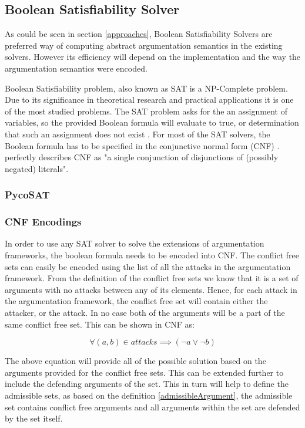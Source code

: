 \subsection{Boolean Satisfiability Solver}
As could be seen in section \ref{approaches}, Boolean Satisfiability Solvers are preferred way of computing abstract argumentation semantics in the existing solvers. However its efficiency will depend on the implementation and the way the argumentation semantics were encoded. 

Boolean Satisfiability problem, also known as SAT is a NP-Complete problem. Due to its significance in theoretical research and practical applications it is one of the most studied problems. The SAT problem asks for the an assignment of variables, so the provided Boolean formula will evaluate to true, or determination that such an assignment does not exist \citep{satSolver1}. For most of the SAT solvers, the Boolean formula has to be specified in the conjunctive normal form (CNF) \citep{SatSolver2}. \citet{cnfDefinition} perfectly describes CNF as "a single conjunction of disjunctions of (possibly negated) literals". 


\subsubsection{PycoSAT}


\subsubsection{CNF Encodings}
In order to use any SAT solver to solve the extensions of argumentation frameworks, the boolean formula needs to be encoded into CNF. The conflict free sets can easily be encoded using the list of all the attacks in the argumentation framework. From the definition of the conflict free sets we know that it is a set of arguments with no attacks between any of its elements. Hence, for each attack in the argumentation framework, the conflict free set will contain either the attacker, or the attack. In no case both of the arguments will be a part of the same conflict free set. This can be shown in CNF as:

\begin{equation}
	  \forall (a,b) \in attacks \implies (\neg a \lor \neg b)
\end{equation}

The above equation will provide all of the possible solution based on the arguments provided for the conflict free sets. This can be extended further to include the defending arguments of the set. This in turn will help to define the admissible sets, as based on the definition \ref{admissibleArgument}, the admissible set contains conflict free arguments and all arguments within the set are defended by the set itself.

